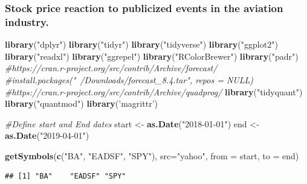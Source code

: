 \documentclass[]{article}
\newenvironment{Shaded}{\begin{snugshade}}{\end{snugshade}}
\newcommand{\CommentTok}[1]{\textcolor[rgb]{0.56,0.35,0.01}{\textit{#1}}}
\newcommand{\DataTypeTok}[1]{\textcolor[rgb]{0.13,0.29,0.53}{#1}}
\newcommand{\KeywordTok}[1]{\textcolor[rgb]{0.13,0.29,0.53}{\textbf{#1}}}
\newcommand{\NormalTok}[1]{#1}
\newcommand{\StringTok}[1]{\textcolor[rgb]{0.31,0.60,0.02}{#1}}
\begin{document}
\hypertarget{stock-price-reaction-to-publicized-events-in-the-aviation-industry.}{%
\subsubsection{Stock price reaction to publicized events in the aviation
industry.}\label{stock-price-reaction-to-publicized-events-in-the-aviation-industry.}}

\begin{Shaded}
\begin{Highlighting}[]
\KeywordTok{library}\NormalTok{(}\StringTok{"dplyr"}\NormalTok{)}
\KeywordTok{library}\NormalTok{(}\StringTok{"tidyr"}\NormalTok{)}
\KeywordTok{library}\NormalTok{(}\StringTok{"tidyverse"}\NormalTok{)}
\KeywordTok{library}\NormalTok{(}\StringTok{"ggplot2"}\NormalTok{)}
\KeywordTok{library}\NormalTok{(}\StringTok{"readxl"}\NormalTok{)}
\KeywordTok{library}\NormalTok{(}\StringTok{"ggrepel"}\NormalTok{)}
\KeywordTok{library}\NormalTok{(}\StringTok{"RColorBrewer"}\NormalTok{)}
\KeywordTok{library}\NormalTok{(}\StringTok{"padr"}\NormalTok{)}
\CommentTok{#https://cran.r-project.org/src/contrib/Archive/forecast/}
\CommentTok{#install.packages("~/Downloads/forecast_8.4.tar", repos = NULL)}
\CommentTok{#https://cran.r-project.org/src/contrib/Archive/quadprog/}
\KeywordTok{library}\NormalTok{(}\StringTok{"tidyquant"}\NormalTok{)}
\KeywordTok{library}\NormalTok{(}\StringTok{"quantmod"}\NormalTok{)}
\KeywordTok{library}\NormalTok{(}\StringTok{'magrittr'}\NormalTok{)}

\CommentTok{#Define start and End dates}
\NormalTok{start <-}\StringTok{ }\KeywordTok{as.Date}\NormalTok{(}\StringTok{"2018-01-01"}\NormalTok{)}
\NormalTok{end <-}\StringTok{ }\KeywordTok{as.Date}\NormalTok{(}\StringTok{"2019-04-01"}\NormalTok{)}

\KeywordTok{getSymbols}\NormalTok{(}\KeywordTok{c}\NormalTok{(}\StringTok{"BA"}\NormalTok{, }\StringTok{"EADSF"}\NormalTok{, }\StringTok{"SPY"}\NormalTok{), }\DataTypeTok{src=}\StringTok{"yahoo"}\NormalTok{, }\DataTypeTok{from =}\NormalTok{ start, }\DataTypeTok{to =}\NormalTok{ end)}
\end{Highlighting}
\end{Shaded}

\begin{verbatim}
## [1] "BA"    "EADSF" "SPY"
\end{verbatim}
\end{document}

